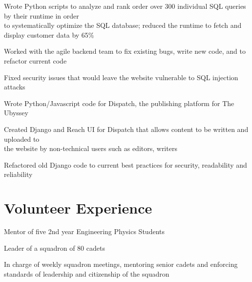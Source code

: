 \documentclass[]{deedy-resume-openfont}
\begin{document}
\begin{tightemize}
	\item Wrote Python scripts to analyze and rank order over 300 individual SQL queries by their runtime in order \\ to systematically optimize the SQL database; reduced the runtime to fetch and display customer data by 65\%
	\item Worked with the agile backend team to fix existing bugs, write new code, and to refactor current code
	\item Fixed security issues that would leave the website vulnerable to SQL injection attacks
\end{tightemize}
\vspace{8pt}

\begin{tightemize}
	\item Wrote Python/Javascript code for Dispatch, the publishing platform for The Ubyssey
	\item Created Django and Reach UI for Dispatch that allows content to be written and uploaded to \\ the website by non-technical users such as editors, writers
	\item Refactored old Django code to current best practices for security, readability and reliability
\end{tightemize}
\vspace{10pt}

\section{Volunteer Experience}
\begin{tightemize}
	\item Mentor of five 2nd year Engineering Physics Students
\end{tightemize}
\vspace{8pt}

\begin{tightemize}
	\item Leader of a squadron of 80 cadets
	\item In charge of weekly squadron meetings, mentoring senior cadets and enforcing standards of leadership and citizenship of the squadron
\end{tightemize}
\vspace{10pt}
\end{document}
